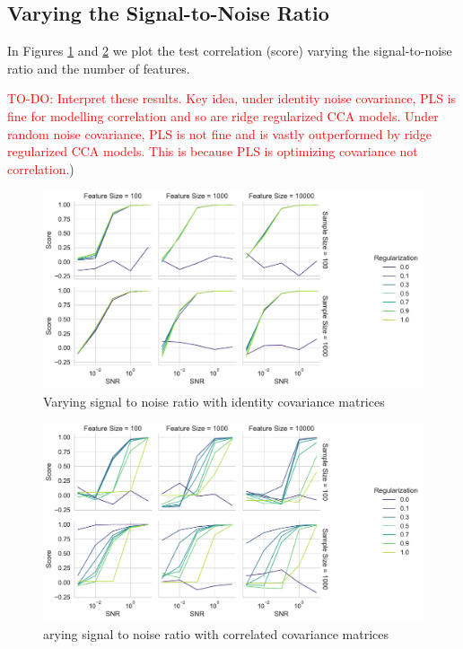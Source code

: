 \subsection{Varying the Signal-to-Noise Ratio}

In Figures \ref{fig:snr-scores-identity} and \ref{fig:snr-scores-random} we plot the test correlation (score) varying the signal-to-noise ratio and the number of features.

\textcolor{red}{TO-DO: Interpret these results. Key idea, under identity noise covariance, PLS is fine for modelling correlation and so are ridge regularized CCA models. Under random noise covariance, PLS is not fine and is vastly outperformed by ridge regularized CCA models. This is because PLS is optimizing covariance not correlation.})

\begin{figure}
    \centering
    \includegraphics[width=\linewidth]{figures/brain_behaviour_sim/snr_vs_scores_facet_identity}
    \caption{Varying signal to noise ratio with identity covariance matrices}\label{fig:snr-scores-identity}
\end{figure}

\begin{figure}
    \centering
    \includegraphics[width=\linewidth]{figures/brain_behaviour_sim/snr_vs_scores_facet_random}
    \caption{arying signal to noise ratio with correlated covariance matrices}\label{fig:snr-scores-random}
\end{figure}

